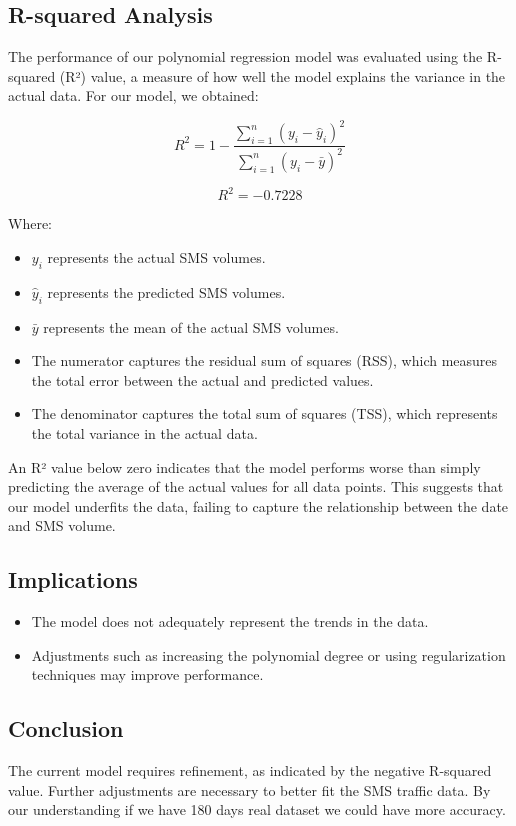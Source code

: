 \documentclass[12pt]{book} %
\begin{document}
\subsection{R-squared Analysis}

The performance of our polynomial regression model was evaluated using the R-squared (R²) value, a measure of how well the model explains the variance in the actual data. For our model, we obtained:


\[
R^2 = 1 - \frac{\sum_{i=1}^{n} (y_i - \hat{y}_i)^2}{\sum_{i=1}^{n} (y_i - \bar{y})^2}
\]


\[
    R^2 = -0.7228
\]

Where:
\begin{itemize}
    \item $y_i$ represents the actual SMS volumes.
    \item $\hat{y}_i$ represents the predicted SMS volumes.
    \item $\bar{y}$ represents the mean of the actual SMS volumes.
    \item The numerator captures the residual sum of squares (RSS), which measures the total error between the actual and predicted values.
    \item The denominator captures the total sum of squares (TSS), which represents the total variance in the actual data.
\end{itemize}

An R² value below zero indicates that the model performs worse than simply predicting the average of the actual values for all data points. This suggests that our model underfits the data, failing to capture the relationship between the date and SMS volume.

\subsection*{Implications}
\begin{itemize}
    \item The model does not adequately represent the trends in the data.
    \item Adjustments such as increasing the polynomial degree or using regularization techniques may improve performance.
\end{itemize}

\subsection*{Conclusion}
The current model requires refinement, as indicated by the negative R-squared value. Further adjustments are necessary to better fit the SMS traffic data. By our understanding if we have 180 days real dataset we could have more accuracy.
\end{document}
